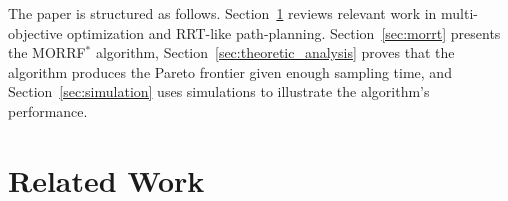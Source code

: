 \documentclass{article}
\begin{document}

The paper is structured as follows.  
Section~\ref{sec:related_works} reviews relevant work in multi-objective optimization and RRT-like path-planning. 
Section~\ref{sec:morrt} presents the MORRF$^{*}$ algorithm,  
Section~\ref{sec:theoretic_analysis} proves that the algorithm produces the Pareto frontier given enough sampling time, 
and Section~\ref{sec:simulation} uses simulations to illustrate the algorithm's performance.

\section{Related Work}
\label{sec:related_works}

\end{document}
